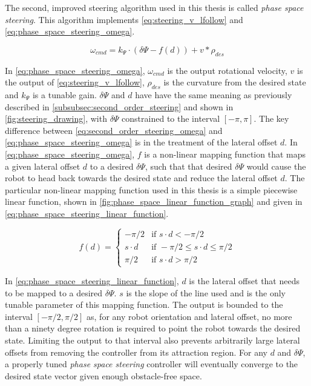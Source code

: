 The second, improved steering algorithm used in this thesis is called \emph{phase space steering}. This algorithm implements \eqref{eq:steering_v_lfollow} and \eqref{eq:phase_space_steering_omega}.

\begin{equation}
\omega_{cmd} = k_\Psi \cdot \left( \delta\Psi - f\left( d \right) \right) + v * \rho_{des}
\label{eq:phase_space_steering_omega}
\end{equation}

In \eqref{eq:phase_space_steering_omega}, $\omega_{cmd}$ is the output rotational velocity, $v$ is the output of \eqref{eq:steering_v_lfollow}, $\rho_{des}$ is the curvature from the desired state and $k_{\Psi}$ is a tunable gain. $\delta\Psi$ and $d$ have have the same meaning as previously described in \autoref{subsubsec:second_order_steering} and shown in \autoref{fig:steering_drawing}, with $\delta\Psi$ constrained to the interval $\left[-\pi,\pi\right]$. The key difference between \eqref{eq:second_order_steering_omega} and \eqref{eq:phase_space_steering_omega} is in the treatment of the lateral offset $d$. In \eqref{eq:phase_space_steering_omega}, $f$ is a non-linear mapping function that maps a given lateral offset $d$ to a desired $\delta\Psi$, such that that desired $\delta\Psi$ would cause the robot to head back towards the desired state and reduce the lateral offset $d$. The particular non-linear mapping function used in this thesis is a simple piecewise linear function, shown in \autoref{fig:phase_space_linear_function_graph} and given in \eqref{eq:phase_space_steering_linear_function}.

\begin{equation}
f\left( d \right) =
	\begin{cases}
		-\pi/2 & \text{if } s \cdot d < -\pi/2 \\
		s \cdot d & \text{if } -\pi/2 \leq s \cdot d \leq \pi/2 \\
		\pi/2 & \text{if } s \cdot d > \pi/2
	\end{cases}
	\label{eq:phase_space_steering_linear_function}
\end{equation}

In \eqref{eq:phase_space_steering_linear_function}, $d$ is the lateral offset that needs to be mapped to a desired $\delta\Psi$. $s$ is the slope of the line used and is the only tunable parameter of this mapping function. The output is bounded to the interval $\left[-\pi/2,\pi/2\right]$ as, for any robot orientation and lateral offset, no more than a ninety degree rotation is required to point the robot towards the desired state. Limiting the output to that interval also prevents arbitrarily large lateral offsets from removing the controller from its attraction region. For any $d$ and $\delta\Psi$, a properly tuned \emph{phase space steering} controller will eventually converge to the desired state vector given enough obstacle-free space.

